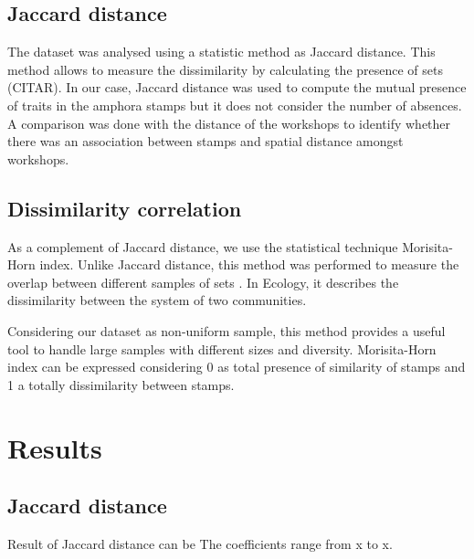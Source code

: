 \documentclass[review]{elsarticle}
\begin{document}


\subsection{Jaccard distance}

The dataset was analysed using a statistic method as Jaccard distance. This method allows to measure the dissimilarity by calculating the presence of sets (CITAR). In our case, Jaccard distance was used to compute the mutual presence of traits in the amphora stamps but it does not consider the number of absences. A comparison was done with the distance of the workshops to identify whether there was an association between stamps and spatial distance amongst workshops. 


\subsection{Dissimilarity correlation}

As a complement of Jaccard distance, we use the statistical technique Morisita-Horn index. Unlike Jaccard distance, this method was performed to measure the overlap between different samples of sets \citep{horn_measurement_1966}. In Ecology, it describes the dissimilarity between the system of two communities. 

Considering our dataset as non-uniform sample, this method provides a useful tool to handle large samples with different sizes and diversity. Morisita-Horn index can be expressed considering 0 as total presence of similarity of stamps and 1 a totally dissimilarity between stamps. 



\section{Results}

\subsection{Jaccard distance}

Result of Jaccard distance can be The coefficients range from x to x.
\end{document}
